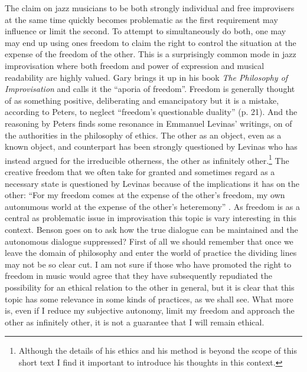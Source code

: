 \documentclass[a4paper]{article}
\begin{document}
The claim on jazz musicians to be both strongly individual and free improvisers at the same time quickly becomes problematic as the first requirement may influence or limit the second. To attempt to simultaneously do both, one may may end up using ones freedom to claim the right to control the situation at the expense of the freedom of the other. This is a surprisingly common mode in jazz improvisation where both freedom and power of expression and musical readability are highly valued. Gary \citet{peters09} brings it up in his book \emph{The Philosophy of Improvisation} and calls it the ``aporia of freedom''. Freedom is generally thought of as something positive, deliberating and emancipatory but it is a mistake, according to Peters, to neglect ``freedom's questionable duality'' (p. 21). And the reasoning by Peters finds some resonance in Emmanuel Levinas' writings, on of the authorities in the philosophy of ethics. The other as an object, even as a known object, and counterpart has been strongly questioned by Levinas who has instead argued for the irreducible otherness, the other as infinitely other.\footnote{Although the details of his ethics and his method is beyond the scope of this short text I find it important to introduce his thoughts in this context.} The creative freedom that we often take for granted and sometimes regard as a necessary state is questioned by Levinas because of the implications it has on the other: ``For my freedom comes at the expense of the other's freedom, my own autonumous world at the expense of the other's heteremony'' \citep[p. 165]{benson03}. As freedom is as a central as problematic issue in improvisation this topic is vary interesting in this context. Benson goes on to ask how the true dialogue can be maintained and the autonomous dialogue suppressed? First of all we should remember that once we leave the domain of philosophy and enter the world of practice the dividing lines may not be so clear cut. I am not sure if those who have promoted the right to freedom in music would agree that they have subsequently repudiated the possibility for an ethical relation to the other in general, but it is clear that this topic has some relevance in some kinds of practices, as we shall see. What more is, even if I reduce my subjective autonomy, limit my freedom and approach the other as infinitely other, it is not a guarantee that I will remain ethical.
\end{document}
